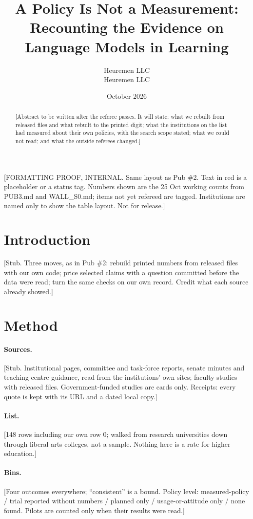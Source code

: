 \documentclass[11pt]{article}
\title{A Policy Is Not a Measurement:\\ Recounting the Evidence on Language Models in Learning}
\author{Heuremen LLC\\ Heuremen LLC}
\date{October 2026}
\newcommand{\proof}[1]{{\color{red}\textsf{[#1]}}}
\begin{document}
\maketitle
\begin{center}\proof{FORMATTING PROOF, INTERNAL. Same layout as Pub \#2. Text in red is a placeholder or a status tag. Numbers shown are the 25 Oct working counts from PUB3.md and WALL\_S0.md; items not yet refereed are tagged. Institutions are named only to show the table layout. Not for release.}\end{center}
\begin{abstract}
\proof{Abstract to be written after the referee passes. It will state: what we rebuilt from released files and what rebuilt to the printed digit; what the institutions on the list had measured about their own policies, with the search scope stated; what we could not read; and what the outside referees changed.}
\end{abstract}

\section{Introduction}
\proof{Stub. Three moves, as in Pub \#2: rebuild printed numbers from released files with our own code; price selected claims with a question committed before the data were read; turn the same checks on our own record. Credit what each source already showed.}

\section{Method}
\paragraph{Sources.} \proof{Stub. Institutional pages, committee and task-force reports, senate minutes and teaching-centre guidance, read from the institutions' own sites; faculty studies with released files. Government-funded studies are cards only. Receipts: every quote is kept with its URL and a dated local copy.}
\paragraph{List.} \proof{148 rows including our own row 0; walked from research universities down through liberal arts colleges, not a sample. Nothing here is a rate for higher education.}
\paragraph{Bins.} \proof{Four outcomes everywhere; ``consistent'' is a bound. Policy level: measured-policy / trial reported without numbers / planned only / usage-or-attitude only / none found. Pilots are counted only when their results were read.}
\end{document}
